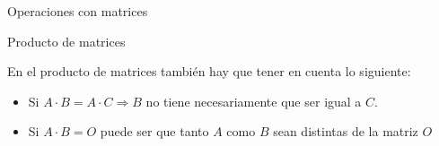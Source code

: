 \documentclass[9pt]{beamer}
\begin{document}
\begin{frame}{Operaciones con matrices}



\end{frame}

\begin{frame}{Producto de matrices}

En el producto de matrices también hay que tener en cuenta lo siguiente:
\begin{itemize}[<+-|alert@+>]

\item Si $A \cdot B = A \cdot C \Rightarrow B$ no tiene necesariamente que ser igual a $C$.
\item Si $A \cdot B = O$ puede ser que tanto $A$ como $B$ sean distintas de la matriz $O$
\end{itemize}
\end{frame}
\end{document}
